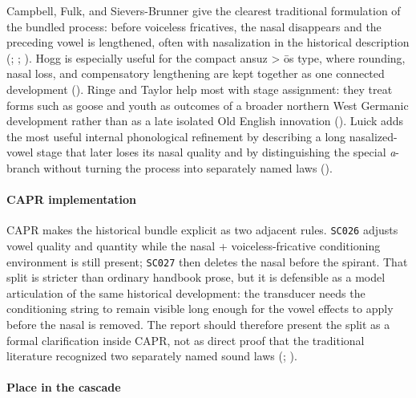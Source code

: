 \documentclass[
  british,
  a4paper,
]{article}
\begin{document}
Campbell, Fulk, and Sievers-Brunner give the clearest traditional
formulation of the bundled process: before voiceless fricatives, the
nasal disappears and the preceding vowel is lengthened, often with
nasalization in the historical description
(;
;
). Hogg is
especially useful for the compact ansuz \textgreater{} ōs type, where
rounding, nasal loss, and compensatory lengthening are kept together as
one connected development (). Ringe
and Taylor help most with stage assignment: they treat forms such as
goose and youth as outcomes of a broader northern West Germanic
development rather than as a late isolated Old English innovation
(). Luick
adds the most useful internal phonological refinement by describing a
long nasalized-vowel stage that later loses its nasal quality and by
distinguishing the special \emph{a}-branch without turning the process
into separately named laws ().

\paragraph{CAPR implementation}\label{capr-implementation-19}

CAPR makes the historical bundle explicit as two adjacent rules.
\texttt{SC026} adjusts vowel quality and quantity while the nasal +
voiceless-fricative conditioning environment is still present;
\texttt{SC027} then deletes the nasal before the spirant. That split is
stricter than ordinary handbook prose, but it is defensible as a model
articulation of the same historical development: the transducer needs
the conditioning string to remain visible long enough for the vowel
effects to apply before the nasal is removed. The report should
therefore present the split as a formal clarification inside CAPR, not
as direct proof that the traditional literature recognized two
separately named sound laws (; ).

\paragraph{Place in the cascade}\label{place-in-the-cascade-19}
\end{document}
